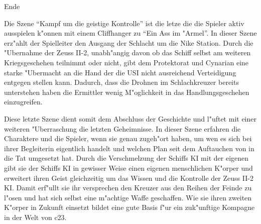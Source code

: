 \begin{remarks}
	\begin{center}\huge{}Ende\end{center}

	Die Szene "`Kampf um die geistige Kontrolle"' ist die letze die die Spieler aktiv ausspielen k"onnen mit einem Cliffhanger zu "`Ein Ass im "Armel"'. In dieser Szene erz"ahlt der Spielleiter den Ausgang der Schlacht um die Nike Station. Durch die "Ubernahme der Zeuss II-2, unabh"angig davon ob das Schiff selbst am weiteren Kriegsgeschehen teilnimmt oder nicht, gibt dem Protektorat und Cynarian eine starke "Ubermacht an die Hand der die USI nicht ausreichend Verteidigung entgegen stellen kann. Dadurch, dass die Drohnen im Schlachkreuzer bereits \xl{} unterstehen haben die Ermittler wenig M"oglichkeit in das Handlungsgeschehen einzugreifen.

	Diese letzte Szene dient somit dem Abschluss der Geschichte und l"uftet mit einer weiteren "Uberraschung die letzten Geheimnisse. In dieser Szene erfahren die Charaktere und die Spieler, wenn sie genau zugeh"ort haben, um wen es sich bei ihrer Begleiterin eigentlich handelt und welchen Plan \xl{} seit dem Auftauchen von \ml{} in die Tat umgesetzt hat. Durch die Verschmelzung der Schiffs KI mit der eigenen gibt sie der Schiffs KI in gewisser Weise einen eigenen menschlichen K"orper und erweitert ihren Geist gleichzeitig um das Wissen und die Kontrolle der Zeuss II-2 KI. Damit erf"ullt sie ihr versprechen den Kreuzer aus den Reihen der Feinde zu l"osen und hat sich selbst eine m"achtige Waffe geschaffen. Wie sie ihren zweiten K"orper in Zukunft einsetzt bildet eine gute Basis f"ur ein zuk"unftige Kompagne in der Welt von c23.
\end{remarks}